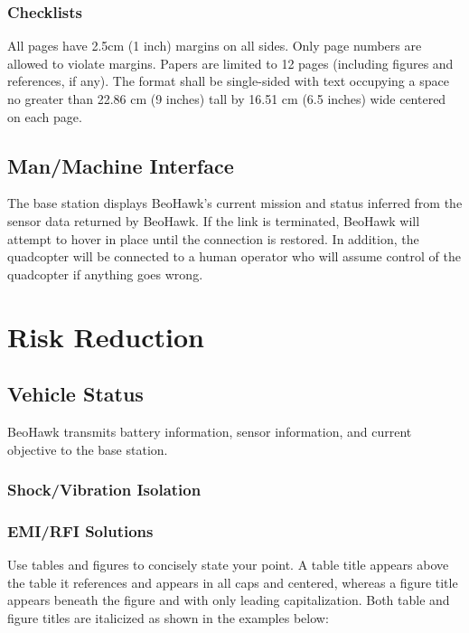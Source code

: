 \documentclass[12pt, letterpaper]{article}
\begin{document}
\subsubsection{Checklists}
All pages have 2.5cm (1 inch) margins on all sides. Only page numbers are allowed to violate margins. Papers are limited to 12 pages (including figures and references, if any). The format shall be single-sided with text occupying a space no greater than 22.86 cm (9 inches) tall by 16.51 cm (6.5 inches) wide centered on each page.

\subsection{Man/Machine Interface}
The base station displays BeoHawk's current mission and status inferred from the sensor data returned by BeoHawk.  If the link is terminated, BeoHawk will attempt to hover in place until the connection is restored. In addition, the quadcopter will be connected to a human operator who will assume control of the quadcopter if anything goes wrong.


\section{Risk Reduction}
\subsection{Vehicle Status}
BeoHawk transmits battery information, sensor information, and current objective to the base station. 

\subsubsection{Shock/Vibration Isolation}

\subsubsection{EMI/RFI Solutions}
Use tables and figures to concisely state your point. A table title appears above the table it references and appears in all caps and centered, whereas a figure title appears beneath the figure and with only leading capitalization. Both table and figure titles are italicized as shown in the examples below:
\end{document}
